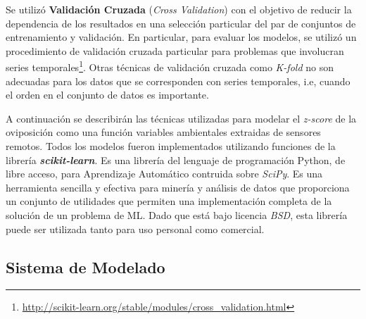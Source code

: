   \par Se utilizó \textbf{Validación Cruzada}
    (\textit{Cross Validation}) \cite{cross_validation, ml_rainfall} con el
    objetivo de reducir la dependencia de los resultados en una selección particular
    del par de conjuntos de entrenamiento y validación. En particular, para
    evaluar los modelos, se utilizó un procedimiento de validación cruzada
    particular para problemas que involucran series temporales\footnote{\url{http://scikit-learn.org/stable/modules/cross_validation.html}}.
    Otras técnicas de validación cruzada como \textit{K-fold} no son
    adecuadas para los datos que se corresponden con series temporales, i.e,
    cuando el orden en el conjunto de datos es importante.

    \par A continuación se describirán las técnicas utilizadas para modelar
    el \textit{z-score} de la oviposición como una función variables ambientales
    extraidas de sensores remotos. Todos los modelos fueron implementados utilizando
    funciones de la librería \textbf{\textit{scikit-learn}}. Es una librería del
    lenguaje de programación Python, de libre
    acceso, para Aprendizaje Automático contruida sobre \textit{SciPy}\cite{scipy}.
    Es una herramienta sencilla y efectiva para minería y análisis de datos que
    proporciona un conjunto de utilidades que permiten una implementación
    completa de la solución de un problema de ML.
    Dado que está bajo licencia \textit{BSD}, esta librería puede ser utilizada
    tanto para uso personal como comercial.


    \subsection{Sistema de Modelado}

